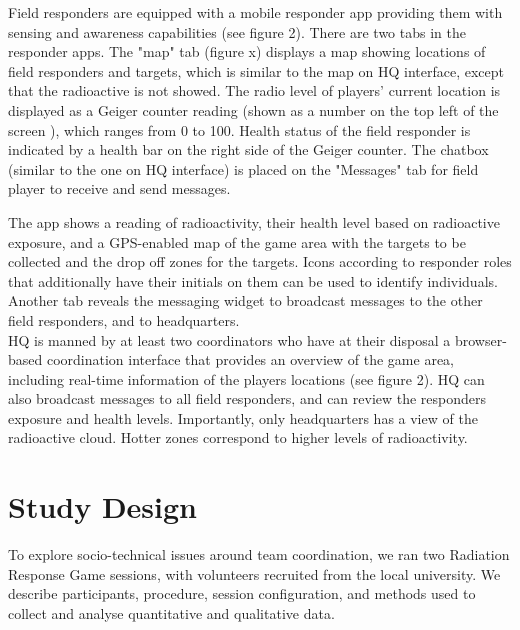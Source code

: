 Field responders are equipped with a mobile responder app providing them with sensing and awareness capabilities (see figure 2). There are two tabs in the responder apps. The "map" tab (figure x) displays a map showing locations of field responders and targets, which is similar to the map on HQ interface, except that the radioactive is not showed. The radio level of players' current location is displayed as a Geiger counter reading (shown as a number on the top left of the screen ), which ranges from 0 to 100. Health status of the field responder is indicated by a health bar on the right side of the Geiger counter. The chatbox (similar to the one on HQ interface) is placed on the "Messages" tab for field player to receive and send messages.



 The app shows a reading of radioactivity, their health level based on radioactive exposure, and a GPS-enabled map of the game area with the targets to be collected and the drop off zones for the targets. Icons according to responder roles that additionally have their initials on them can be used to identify individuals. Another tab reveals the messaging widget to broadcast messages to the other field responders, and to headquarters.\\

HQ is manned by at least two coordinators who have at their disposal a browser- based coordination interface that provides an overview of the game area, including real-time information of the players locations (see figure 2). HQ can also broadcast messages to all field responders, and can review the responders exposure and health levels. Importantly, only headquarters has a view of the radioactive cloud. Hotter zones correspond to higher levels of radioactivity.\\



\section{Study Design}


To explore socio-technical issues around team coordination, we ran two Radiation Response Game sessions, with volunteers recruited from the local university. We describe participants, procedure, session configuration, and methods used to collect and analyse quantitative and qualitative data.\\

